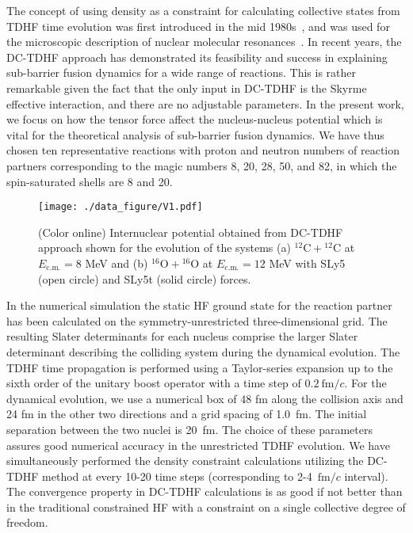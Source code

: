 \documentclass[aps,prc,twocolumn,showpacs,superscriptaddress,longbibliography,nofootinbib,floatfix,10pt]{revtex4-1}
\begin{document}
The concept of using density as a constraint for calculating collective states from TDHF time evolution was first introduced in the mid 1980s~\cite{Cusson1985_ZPA320-475}, and was used for the microscopic description of nuclear molecular resonances~\cite{Umar1985_PRC32-172}.
In recent years, the DC-TDHF approach has demonstrated its feasibility and success in explaining sub-barrier fusion dynamics for a wide range of reactions.
This is rather remarkable given the fact that the only input in DC-TDHF is the Skyrme effective interaction, and there are no adjustable parameters.
In the present work, we focus on how the tensor force affect the nucleus-nucleus potential which is vital for the theoretical analysis of sub-barrier fusion dynamics.
We have thus chosen ten representative reactions with proton and neutron numbers of reaction partners corresponding to the magic numbers 8, 20, 28, 50, and 82,
in which the spin-saturated shells are 8 and 20.
\begin{figure}
\texttt{[image: ./data\_figure/V1.pdf]}
\caption{(Color online) Internuclear potential obtained from DC-TDHF approach shown for the evolution of the systems (a) $^{12}\mathrm{C}+\mathrm{^{12}C}$
at $E_{\mathrm{c.m.}}=8$ MeV  and (b) $^{16}\mathrm{O}+\mathrm{^{16}O}$ at $E_{\mathrm{c.m.}}=12$ MeV with SLy5 (open circle) and SLy5t (solid circle) forces.
\label{Fig:light}}
\end{figure}

In the numerical simulation the static HF ground state for the reaction partner has been calculated on the symmetry-unrestricted three-dimensional grid.
The resulting Slater determinants for each nucleus comprise the larger Slater determinant describing the colliding system during the dynamical evolution.
The TDHF time propagation is performed using a Taylor-series expansion up to the sixth order of the unitary boost operator with
a time step of $0.2 ~\mathrm {fm}/c$. For the dynamical evolution, we use a numerical box of 48 fm along the collision axis and 24 fm in the
other two directions and a grid spacing of 1.0~fm. The initial separation between the two nuclei is 20~fm. The choice of these
parameters assures good numerical accuracy in the unrestricted TDHF evolution. We have simultaneously performed the density constraint
calculations utilizing the DC-TDHF method at every 10-20 time steps (corresponding to 2-4~$\mathrm {fm}/c$ interval).
The convergence property in DC-TDHF calculations is as good if
not better than in the traditional constrained HF with a constraint on a single collective degree of freedom.
\end{document}
